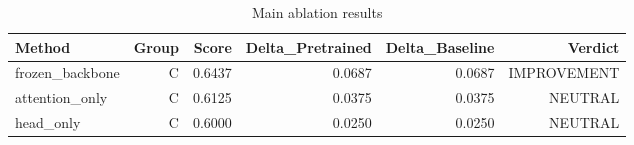 \begin{table}[htbp]
\centering
\caption{Main ablation results}
\label{tab:main-results}
\begin{tabular}{lrrrrr}
\toprule
\textbf{Method} & \textbf{Group} & \textbf{Score} & \textbf{Delta\_Pretrained} & \textbf{Delta\_Baseline} & \textbf{Verdict} \\
\midrule
frozen\_backbone & C & 0.6437 & 0.0687 & 0.0687 & IMPROVEMENT \\
attention\_only & C & 0.6125 & 0.0375 & 0.0375 & NEUTRAL \\
head\_only & C & 0.6000 & 0.0250 & 0.0250 & NEUTRAL \\
\bottomrule
\end{tabular}
\end{table}